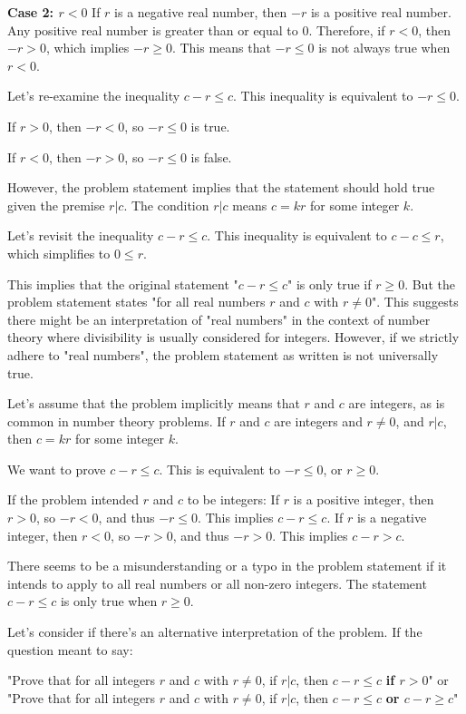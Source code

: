 \documentclass{article}
\begin{document}
\textbf{Case 2: $r < 0$}
If $r$ is a negative real number, then $-r$ is a positive real number. Any positive real number is greater than or equal to 0.
Therefore, if $r < 0$, then $-r > 0$, which implies $-r \geq 0$.
This means that $-r \leq 0$ is not always true when $r < 0$.

Let's re-examine the inequality $c - r \leq c$.
This inequality is equivalent to $-r \leq 0$.

If $r > 0$, then $-r < 0$, so $-r \leq 0$ is true.

If $r < 0$, then $-r > 0$, so $-r \leq 0$ is false.

However, the problem statement implies that the statement should hold true given the premise $r | c$. The condition $r|c$ means $c=kr$ for some integer $k$.

Let's revisit the inequality $c - r \leq c$.
This inequality is equivalent to $c - c \leq r$, which simplifies to $0 \leq r$.

This implies that the original statement "$c-r \leq c$" is only true if $r \geq 0$. But the problem statement states "for all real numbers $r$ and $c$ with $r \neq 0$". This suggests there might be an interpretation of "real numbers" in the context of number theory where divisibility is usually considered for integers. However, if we strictly adhere to "real numbers", the problem statement as written is not universally true.

Let's assume that the problem implicitly means that $r$ and $c$ are integers, as is common in number theory problems. If $r$ and $c$ are integers and $r \neq 0$, and $r | c$, then $c = kr$ for some integer $k$.

We want to prove $c - r \leq c$. This is equivalent to $-r \leq 0$, or $r \geq 0$.

If the problem intended $r$ and $c$ to be integers:
If $r$ is a positive integer, then $r > 0$, so $-r < 0$, and thus $-r \leq 0$. This implies $c-r \leq c$.
If $r$ is a negative integer, then $r < 0$, so $-r > 0$, and thus $-r > 0$. This implies $c-r > c$.

There seems to be a misunderstanding or a typo in the problem statement if it intends to apply to all real numbers or all non-zero integers. The statement $c-r \leq c$ is only true when $r \geq 0$.

Let's consider if there's an alternative interpretation of the problem. If the question meant to say:

"Prove that for all integers $r$ and $c$ with $r \neq 0$, if $r | c$, then $c-r \leq c$ \textbf{if $r > 0$}"
or
"Prove that for all integers $r$ and $c$ with $r \neq 0$, if $r | c$, then $c-r \leq c$ \textbf{or $c-r \geq c$}"
\end{document}
